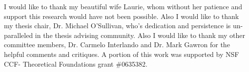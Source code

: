 \documentclass{sdsu-thesis}
\theoremstyle{definition}
\theoremstyle{remark}
\begin{document}
\listoftables

\listoffigures

\begin{acknowledgements}
I would like to thank my beautiful wife Laurie, whom without her patience and support this research would have not been possible. Also I would like to thank my thesis chair, Dr. Michael O'Sullivan, who's dedication and persistence is un-paralleled in the thesis advising community. Also I would like to thank my other committee members, Dr. Carmelo Interlando and Dr. Mark Gawron for the helpful comments and critiques. A portion of this work was supported by NSF CCF- Theoretical Foundations grant \#0635382. 
\end{acknowledgements}


% 
% 
% 


%
%
%



%
%
%
\end{document}
